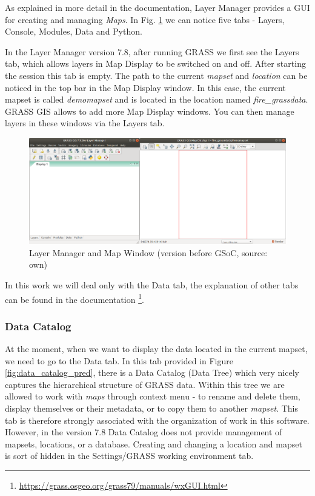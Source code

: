 \documentclass[a4paper,10pt,twoside]{article}
\begin{document}
As explained in more detail in the documentation, Layer Manager provides a GUI for creating and managing \textit{Maps}. In Fig. \ref{fig:empty_layers1} we can notice five tabs - Layers, Console, Modules, Data and Python.

In the Layer Manager version 7.8, after running GRASS we first see the Layers tab, which allows layers in Map Display to be switched on and off. After starting the session this tab is empty. The path to the current \textit{mapset} and \textit{location} can be noticed in the top bar in the Map Display window. In this case, the current mapset is called \textit{demomapset} and is located in the location named \textit{fire\_grassdata}. GRASS GIS allows to add more Map Display windows. You can then manage layers in these windows via the Layers tab.
\vspace{0.3cm}
\begin{figure}[hbt!] 
\begin{center}
\includegraphics[width=17cm]{../pictures/empty_layers1.png} 
\caption[Layer Manager and Map Window (version before GSoC)]{Layer Manager and Map Window  (version before GSoC, source: own)}
\label{fig:empty_layers1}
\end{center}
\end{figure}

\noindent In this work we will deal only with the Data tab, the explanation of other tabs can be found in the documentation \footnote{\url{https://grass.osgeo.org/grass79/manuals/wxGUI.html}}.
 
\newpage
\vspace*{-1cm}
\subsubsection{Data Catalog}

At the moment, when we want to display the data located in the current mapset, we need to go to the Data tab. In this tab provided in Figure \ref{fig:data_catalog_pred}, there is a Data Catalog (Data Tree) which very nicely captures the hierarchical structure of GRASS data. Within this tree we are allowed to work with \textit{maps} through context menu - to rename and delete them, display themselves or their metadata, or to copy them to another \textit{mapset}. This tab is therefore strongly associated with the organization of work in this software. However, in the version 7.8 Data Catalog does not provide management of mapsets, locations, or a database. Creating and changing a location and mapset is sort of hidden in the Settings/GRASS working environment tab.
\end{document}
